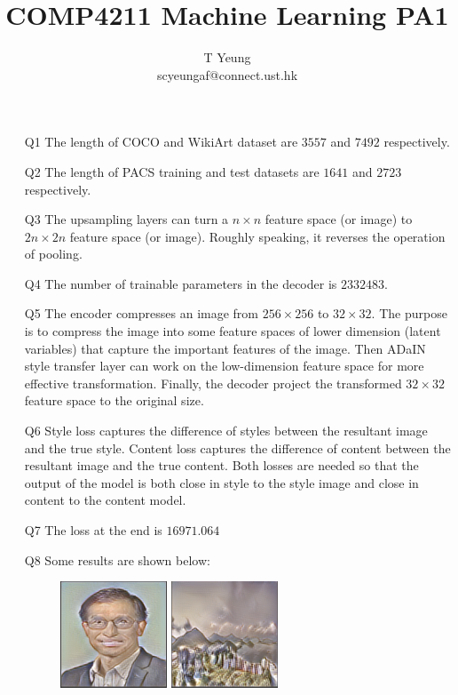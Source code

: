 \documentclass{article}
\title{COMP4211 Machine Learning PA1}
\author{T Yeung \\ scyeungaf@connect.ust.hk}
\begin{document}
\maketitle
\begin{enumerate}
	\item[Q1] The length of COCO and WikiArt dataset are $3557$ and $7492$ respectively.
	\item[Q2] The length of PACS training and test datasets are $1641$ and $2723$ respectively.
	\item[Q3] The upsampling layers can turn a $n \times n$ feature space (or image) to $2n \times 2n$ feature space (or image). Roughly speaking, it reverses the operation of pooling.
	\item[Q4] The number of trainable parameters in the decoder is $2332483$.
	\item[Q5] The encoder compresses an image from $256 \times 256$ to $32 \times 32$. The purpose is to compress the image into some feature spaces of lower dimension (latent variables) that capture the important features of the image. Then ADaIN style transfer layer can work on the low-dimension feature space for more effective transformation. Finally, the decoder project the transformed $32 \times 32$ feature space to the original size.
	\item[Q6] Style loss captures the difference of styles between the resultant image and the true style. Content loss captures the difference of content between the resultant image and the true content. Both losses are needed so that the output of the model is both close in style to the style image and close in content to the content model.
	\item[Q7] The loss at the end is $16971.064$
	\item[Q8] Some results are shown below:
		\begin{figure}[H]
			\centering
			\includegraphics[width=0.3\textwidth]{figures/1.png}
			\includegraphics[width=0.3\textwidth]{figures/2.png}

\end{figure}
\end{enumerate}
\end{document}
